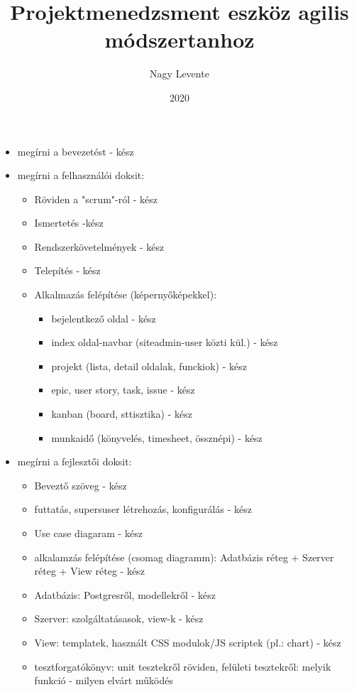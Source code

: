\documentclass[
]{elteikthesis}[2019/06/10]
\title{ Projektmenedzsment eszköz agilis módszertanhoz} %
\date{2020} %
\author{Nagy Levente}
\affiliation{egyetemi docens} %
\begin{document}

\listoftodos[\todolabel]

\begin{itemize}
  \item megírni a bevezetést - kész
  \item megírni a felhasználói doksit:
  \begin{itemize}
    \item Röviden a "scrum"-ról - kész
    \item Ismertetés -kész
    \item Rendszerkövetelmények - kész
    \item Telepítés - kész
    \item Alkalmazás felépítése (képernyőképekkel):
	\begin{itemize}
		\item bejelentkező oldal - kész
		\item index oldal-navbar (siteadmin-user közti kül.) - kész
		\item projekt (lista, detail oldalak, funckiok) - kész
	 	\item epic, user story, task, issue - kész
		\item kanban (board, sttisztika) - kész
		\item munkaidő (könyvelés, timesheet, össznépi) - kész
	\end{itemize}
  \end{itemize}
  \item megírni a fejlesztői doksit:
	\begin{itemize}
		\item Beveztő szöveg - kész
		\item  futtatás, supersuser létrehozás, konfigurálás - kész
		\item Use case diagaram - kész
		\item alkalamzás felépítése (csomag diagramm): Adatbázis réteg + Szerver réteg + View réteg - kész
		\item Adatbázis: Postgresről, modellekről - kész
		\item Szerver: szolgáltatásasok, view-k - kész
		\item View: templatek, használt CSS modulok/JS scriptek (pl.: chart) - kész
		\item tesztforgatókönyv: unit tesztekről röviden, felületi tesztekről: melyik funkció - milyen elvárt működés
	\end{itemize}
\end{itemize}
\end{document}
